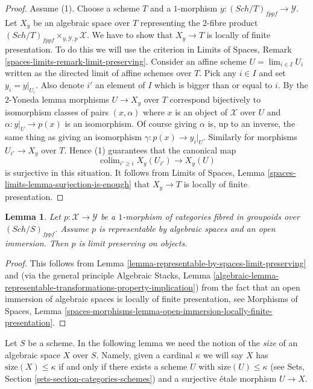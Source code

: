 \documentclass{stacks-project}
\theoremstyle{plain}
\newtheorem{lemma}[subsection]{Lemma}
\theoremstyle{definition}
\theoremstyle{remark}
\numberwithin{equation}{subsection}
\def\lim{\mathop{\mathrm{lim}}\nolimits}
\def\colim{\mathop{\mathrm{colim}}\nolimits}
\def\Sch{\mathit{Sch}}
\begin{document}
\begin{proof}
\medskip\noindent
Assume (1). Choose a scheme $T$ and a $1$-morphism
$y : (\Sch/T)_{fppf} \to \mathcal{Y}$. Let
$X_y$ be an algebraic space over $T$ representing the $2$-fibre product
$(\Sch/T)_{fppf} \times_{y, \mathcal{Y}, p} \mathcal{X}$.
We have to show that $X_y \to T$ is locally of finite presentation.
To do this we will use the criterion in
Limits of Spaces, Remark \ref{spaces-limits-remark-limit-preserving}.
Consider an affine scheme $U = \lim_{i \in I} U_i$ written as the
directed limit of affine schemes over $T$.
Pick any $i \in I$ and set $y_i = y|_{U_i}$. Also denote $i'$ an element
of $I$ which is bigger than or equal to $i$. By the $2$-Yoneda lemma
morphisms $U \to X_y$ over $T$ correspond bijectively
to isomorphism classes of pairs $(x, \alpha)$ where $x$ is an object
of $\mathcal{X}$ over $U$ and $\alpha : y|_U \to p(x)$ is an isomorphism.
Of course giving $\alpha$ is, up to an inverse, the same thing as giving
an isomorphism $\gamma : p(x) \to y_i|_U$.
Similarly for morphisms $U_{i'} \to X_y$ over $T$. Hence (1) guarantees
that the canonical map
$$
\colim_{i' \geq i} X_y(U_{i'}) \longrightarrow X_y(U)
$$
is surjective in this situation. It follows from
Limits of Spaces, Lemma \ref{spaces-limits-lemma-surjection-is-enough}
that $X_y \to T$ is locally of finite presentation.
\end{proof}

\begin{lemma}
\label{lemma-open-immersion-limit-preserving}
Let $p : \mathcal{X} \to \mathcal{Y}$ be a $1$-morphism of categories
fibred in groupoids over $(\Sch/S)_{fppf}$. Assume $p$ is representable
by algebraic spaces and an open immersion. Then $p$ is limit preserving
on objects.
\end{lemma}

\begin{proof}
This follows from
Lemma \ref{lemma-representable-by-spaces-limit-preserving}
and (via the general principle
Algebraic Stacks, Lemma
\ref{algebraic-lemma-representable-transformations-property-implication})
from the fact that an open immersion of algebraic spaces is
locally of finite presentation, see
Morphisms of Spaces, Lemma
\ref{spaces-morphisms-lemma-open-immersion-locally-finite-presentation}.
\end{proof}

\noindent
Let $S$ be a scheme. In the following lemma we need the notion of the
{\it size} of an algebraic space $X$ over $S$. Namely, given a cardinal
$\kappa$ we will say $X$ has $\text{size}(X) \leq \kappa$ if and only
if there exists a scheme $U$ with $\text{size}(U) \leq \kappa$ (see
Sets, Section \ref{sets-section-categories-schemes}) and a surjective
\'etale morphism $U \to X$.
\end{document}
